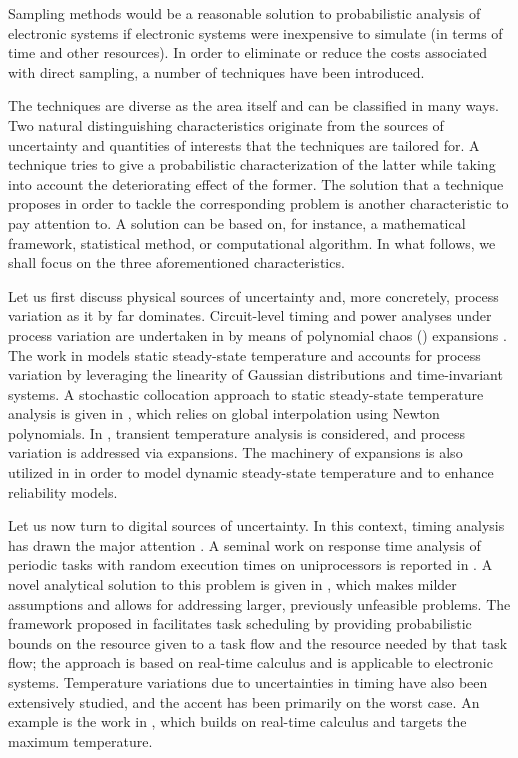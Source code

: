 Sampling methods would be a reasonable solution to probabilistic analysis of
electronic systems if electronic systems were inexpensive to simulate (in terms
of time and other resources). In order to eliminate or reduce the costs
associated with direct sampling, a number of techniques have been introduced.

The techniques are diverse as the area itself and can be classified in many
ways. Two natural distinguishing characteristics originate from the sources of
uncertainty and quantities of interests that the techniques are tailored for. A
technique tries to give a probabilistic characterization of the latter while
taking into account the deteriorating effect of the former. The solution that a
technique proposes in order to tackle the corresponding problem is another
characteristic to pay attention to. A solution can be based on, for instance, a
mathematical framework, statistical method, or computational algorithm. In what
follows, we shall focus on the three aforementioned characteristics.

Let us first discuss physical sources of uncertainty and, more concretely,
process variation as it by far dominates. Circuit-level timing and power
analyses under process variation are undertaken in \cite{bhardwaj2008} by means
of polynomial chaos () expansions \cite{xiu2010}. The work in
\cite{juan2012} models static steady-state temperature and accounts for process
variation by leveraging the linearity of Gaussian distributions and
time-invariant systems. A stochastic collocation \cite{xiu2010} approach to
static steady-state temperature analysis is given in \cite{lee2013}, which
relies on global interpolation using Newton polynomials. In \cite{ukhov2014},
transient temperature analysis is considered, and process variation is addressed
via  expansions. The machinery of  expansions is also utilized in
\cite{ukhov2015} in order to model dynamic steady-state temperature
\cite{ukhov2012} and to enhance reliability models.

Let us now turn to digital sources of uncertainty. In this context, timing
analysis has drawn the major attention \cite{quinton2012}. A seminal work on
response time analysis of periodic tasks with random execution times on
uniprocessors is reported in \cite{diaz2002}. A novel analytical solution to
this problem is given in \cite{tanasa2015}, which makes milder assumptions and
allows for addressing larger, previously unfeasible problems. The framework
proposed in \cite{santinelli2011} facilitates task scheduling by providing
probabilistic bounds on the resource given to a task flow and the resource
needed by that task flow; the approach is based on real-time calculus and is
applicable to electronic systems. Temperature variations due to uncertainties in
timing have also been extensively studied, and the accent has been primarily on
the worst case. An example is the work in \cite{yang2013}, which builds on
real-time calculus and targets the maximum temperature.

